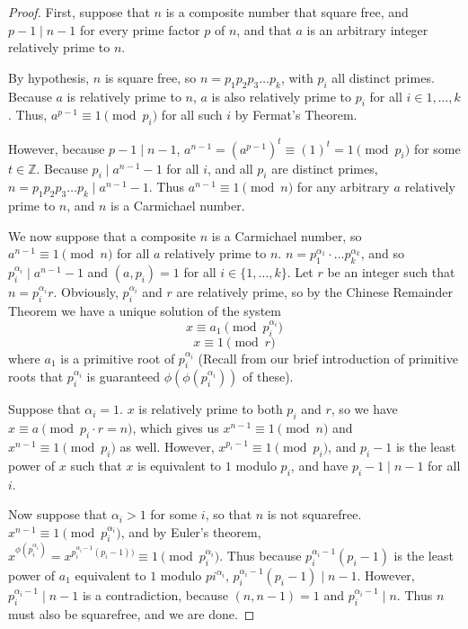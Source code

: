 \documentclass{article}
\begin{document}
\begin{proof}
First, suppose that $n$ is a composite number that square free, and $p-1 \mid n-1$ for every prime factor $p$ of $n$, and that $a$ is an arbitrary integer relatively prime to $n$.
\par By hypothesis, $n$ is square free, so $n = p_1 p_2 p_3 \ldots p_k$, with $p_i$ all distinct primes. Because $a$ is relatively prime to $n$, $a$ is also relatively prime to $p_i$ for all $i \in {1, \ldots, k}$. Thus, $a^{p-1} \equiv 1 \pmod{p_i}$ for all such $i$ by Fermat's Theorem.
\par However, because $p -1 \mid n -1$, $a^{n-1} = (a^{p-1})^t \equiv (1)^t = 1 \pmod{p_i}$ for some $t \in \mathbb Z$. Because $p_i \mid a^{n-1} - 1$ for all $i$, and all $p_i$ are distinct primes, $n = p_1p_2p_3 \ldots p_k \mid a^{n-1} - 1$. Thus $a^{n-1} \equiv 1 \pmod n$ for any arbitrary $a$ relatively prime to $n$, and $n$ is a Carmichael number.
\par
We now suppose that a composite $n$ is a Carmichael number, so $a^{n-1} \equiv 1 \pmod n$ for all $a$ relatively prime to $n$. $n = p_1^{\alpha_1}\cdot \ldots p_k^{\alpha_k}$, and so $p_i^{\alpha_i} \mid a^{n-1} - 1 $ and $(a,p_i) = 1$ for all $i \in \{1, \ldots, k\}$. Let $r$ be an integer such that $n = p_i^{\alpha_i} r$. Obviously, $p_i^{\alpha_i}$ and $r$ are relatively prime, so by the Chinese Remainder Theorem we have a unique solution of the system
	$$x \equiv a_1 \pmod{p_i^{\alpha_i}}$$
	$$x \equiv 1 \pmod{r}$$
where $a_1$ is a primitive root of $p_i^{\alpha_i}$ (Recall from our brief introduction of primitive roots that $p_i^{\alpha_i}$ is guaranteed $\phi(\phi(p_i^{\alpha_i}))$ of these).
\par Suppose that $\alpha_i = 1$. $x$ is relatively prime to both $p_i$ and $r$, so we have $x \equiv a \pmod{p_i \cdot r = n}$, which gives us $x^{n-1} \equiv 1 \pmod n$ and $x^{n-1} \equiv 1 \pmod {p_i}$ as well. However, $x^{p_i - 1} \equiv 1 \pmod{p_i}$, and $p_i - 1$ is the least power of $x$ such that $x$ is equivalent to $1$ modulo $p_i$, and have $p_i -1 \mid n - 1$ for all $i$. 
\par Now suppose that $\alpha_i >1$ for some $i$, so that $n$ is not squarefree. $x^{n-1} \equiv 1 \pmod{p_i^{\alpha_i}}$, and by Euler's theorem, $x^{\phi(p_i^{\alpha_i})} = x^{p_i^{\alpha_i - 1}(p_i - 1))}  \equiv 1 \pmod{p_i^{\alpha_i}}$. Thus because $p_i^{\alpha_i -1}(p_i - 1)$ is the least power of $a_1$ equivalent to $1$ modulo $pi^{\alpha_i}$, $p_i^{\alpha_i -1}(p_i - 1) \mid n - 1$. However, $p_i^{\alpha_i - 1} \mid n - 1$ is a contradiction, because $(n, n-1) = 1$ and $p_i^{\alpha_i - 1} \mid n$. Thus $n$ must also be squarefree, and we are done. 
\end{proof}
\end{document}
